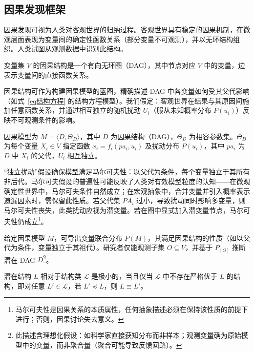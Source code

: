 \subsection{因果发现框架}

因果发现可视为人类对客观世界的归纳过程。客观世界具有稳定的因果机制，在微观层面表现为变量间的确定性函数关系（部分变量不可观测），并以无环结构组织。人类试图从观测数据中识别此结构。

\begin{definition}
	变量集 $V$ 的因果结构是一个有向无环图（DAG），其中节点对应 $V$ 中的变量，边表示变量间的直接函数关系。
\end{definition}

因果结构可作为构建因果模型的蓝图，精确描述 DAG 中各变量如何受其父代影响（如式~\ref{eq结构方程} 的结构方程模型）。我们假定：客观世界在结果与其原因间施加任意函数关系，并通过相互独立的随机扰动 $U_i$（服从未知概率分布 $P(u_i)$）反映不可观测条件的影响。

\begin{definition}[因果模型]
	因果模型为 $M = \langle D, \Theta_D \rangle$，其中 $D$ 为因果结构（DAG），$\Theta_D$ 为相容参数集。$\Theta_D$ 为每个变量 $X_i \in V$ 指定函数 $x_i = f_i(pa_i, u_i)$ 及扰动分布 $P(u_i)$，其中 $pa_i$ 为 $D$ 中 $X_i$ 的父代，$U_i$ 相互独立。
\end{definition}

“独立扰动”假设确保模型满足马尔可夫性：以父代为条件，每个变量独立于其所有非后代。马尔可夫假设的普遍性可能反映了人类对有效模型粒度的认知——在微观确定性世界中，马尔可夫条件自然成立；在宏观抽象中，合并变量并引入概率表示遗漏因素时，需保留此性质。若父代集 $PA_i$ 过小，导致扰动同时影响多变量，则马尔可夫性丧失，此类扰动应视为潜变量。若在图中显式加入潜变量节点，马尔可夫性仍成立\footnote{马尔可夫性是因果关系的本质属性，任何抽象描述必须在保持该性质的前提下进行；否则，因果讨论失去意义。}。

给定因果模型 $M$，可导出变量联合分布 $P(M)$，其满足因果结构的性质（如以父代为条件，变量独立于其祖代）。研究者仅能观测子集 $O \subseteq V$，并基于 $P_{[O]}$ 推断潜在 DAG $D$\footnote{此描述含理想化假设：如科学家直接获知分布而非样本；观测变量确为原始模型中的变量，而非聚合量（聚合可能导致反馈回路）。}。

\begin{definition}[极小性]
	潜在结构 $L$ 相对于结构类 $\mathcal{L}$ 是极小的，当且仅当 $\mathcal{L}$ 中不存在严格优于 $L$ 的结构，即对任意 $L' \in \mathcal{L}$，若 $L' \preceq L$，则 $L \equiv L'$。
\end{definition}

